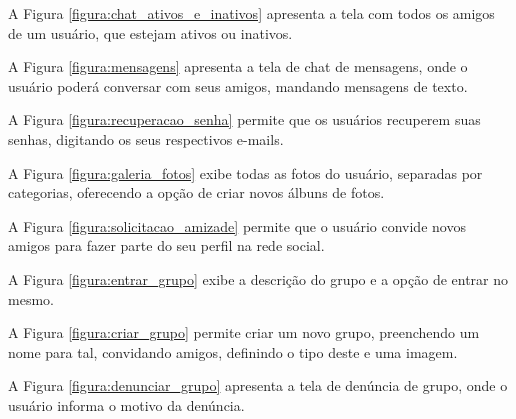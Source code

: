 
A Figura \ref{figura:chat_ativos_e_inativos} apresenta a tela com todos os amigos de um usuário, que estejam ativos ou inativos.


A Figura \ref{figura:mensagens} apresenta a tela de chat de mensagens, onde o usuário poderá conversar com seus amigos, mandando mensagens de texto.


A Figura \ref{figura:recuperacao_senha} permite que os usuários recuperem suas senhas, digitando os seus respectivos e-mails.


A Figura \ref{figura:galeria_fotos} exibe todas as fotos do usuário, separadas por categorias, oferecendo a opção de criar novos álbuns de fotos.


A Figura \ref{figura:solicitacao_amizade} permite que o usuário convide novos amigos para fazer parte do seu perfil na rede social.


A Figura \ref{figura:entrar_grupo} exibe a descrição do grupo e a opção de entrar no mesmo.


A Figura \ref{figura:criar_grupo} permite criar um novo grupo, preenchendo um nome para tal, convidando amigos, definindo o tipo deste e uma imagem.


A Figura \ref{figura:denunciar_grupo} apresenta a tela de denúncia de grupo, onde o usuário informa o motivo da denúncia.


